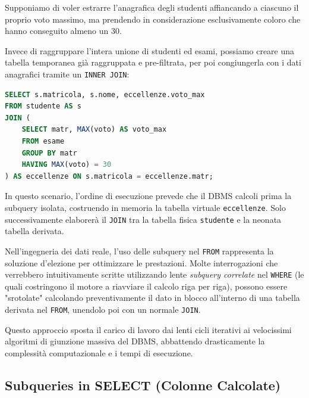 \begin{example}
Supponiamo di voler estrarre l'anagrafica degli studenti affiancando a ciascuno il proprio voto massimo, ma prendendo in considerazione esclusivamente coloro che hanno conseguito almeno un 30.

Invece di raggruppare l'intera unione di studenti ed esami, possiamo creare una tabella temporanea già raggruppata e pre-filtrata, per poi congiungerla con i dati anagrafici tramite un \texttt{INNER JOIN}:

\begin{lstlisting}[language=SQL, basicstyle=\ttfamily\small, keywordstyle=\color{blue}\bfseries]
SELECT s.matricola, s.nome, eccellenze.voto_max
FROM studente AS s
JOIN (
    SELECT matr, MAX(voto) AS voto_max
    FROM esame
    GROUP BY matr
    HAVING MAX(voto) = 30
) AS eccellenze ON s.matricola = eccellenze.matr;
\end{lstlisting}

In questo scenario, l'ordine di esecuzione prevede che il DBMS calcoli prima la subquery isolata, costruendo in memoria la tabella virtuale \texttt{eccellenze}. Solo successivamente elaborerà il \texttt{JOIN} tra la tabella fisica \texttt{studente} e la neonata tabella derivata.
\end{example}

\begin{bestpractice}
Nell'ingegneria dei dati reale, l'uso delle subquery nel \texttt{FROM} rappresenta la soluzione d'elezione per ottimizzare le prestazioni. Molte interrogazioni che verrebbero intuitivamente scritte utilizzando lente \textit{subquery correlate} nel \texttt{WHERE} (le quali costringono il motore a riavviare il calcolo riga per riga), possono essere "srotolate" calcolando preventivamente il dato in blocco all'interno di una tabella derivata nel \texttt{FROM}, unendolo poi con un normale \texttt{JOIN}. 

Questo approccio sposta il carico di lavoro dai lenti cicli iterativi ai velocissimi algoritmi di giunzione massiva del DBMS, abbattendo drasticamente la complessità computazionale e i tempi di esecuzione.
\end{bestpractice}

\subsection{Subqueries in SELECT (Colonne Calcolate)}

